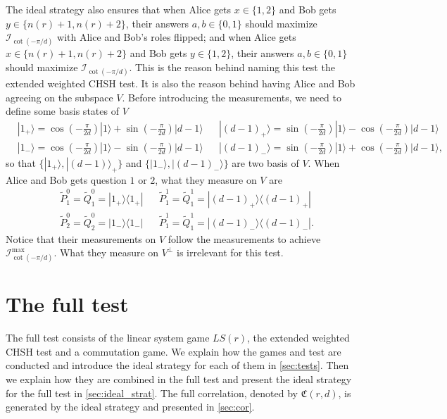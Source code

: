 \documentclass[11pt,letterpaper]{article}
\newcommand{\ket}[1]{|#1\rangle}
\newcommand{\ketbra}[2]{|#1\rangle\langle#2|}
\newcommand{\1}{\mathbb{1}}
\newcommand{\LS}{LS}
\newcommand{\tP}{\tilde{P}}
\newcommand{\tQ}{\tilde{Q}}
\newcommand{\nr}{n(r)}
\newcommand{\fC}{\mathfrak{C}}
\newcommand{\I}{\mathcal{I}}
\theoremstyle{definition}
\begin{document}
The ideal strategy also ensures that 
when Alice gets $x \in \{1,2\}$ and Bob gets $y \in \{\nr+1, \nr+2\}$, 
their answers $a,b \in \{0,1\}$ should maximize $\I_{\cot(-\pi/d)}$ with Alice and Bob's roles flipped;
and when Alice gets $x \in \{\nr+1,\nr+2\}$ and Bob gets $y \in \{1, 2\}$,
their answers $a,b \in \{0,1\}$ should maximize $\I_{\cot(-\pi/d)}$.
This is the reason behind naming this test the extended weighted CHSH test.
It is also the reason behind having Alice and Bob agreeing on the subspace $V$.
Before introducing the measurements, 
we need to define some basis states of $V$
\begin{align*}
	&\ket{1_+} = \cos(-\frac{\pi}{2d})\ket{1} + \sin(-\frac{\pi}{2d})\ket{d-1}
	&&\ket{(d-1)_+} = \sin(-\frac{\pi}{2d})\ket{1} - \cos(-\frac{\pi}{2d})\ket{d-1}\\
	&\ket{1_-} = \cos(-\frac{\pi}{2d})\ket{1} - \sin(-\frac{\pi}{2d})\ket{d-1}
	&&\ket{(d-1)_-} = \sin(-\frac{\pi}{2d})\ket{1} + \cos(-\frac{\pi}{2d})\ket{d-1},
\end{align*}
so that $\{\ket{1_+}, \ket{(d-1)}_+\}$ and $\{\ket{1_-}, \ket{(d-1)_-}\}$ are two basis
of $V$.
When Alice and Bob gets question $1$ or $2$, what they measure on $V$ are
\begin{align*}
	&\tP_1^0 = \tQ_1^0 =  \ketbra{1_+}{1_+} && \tP_1^1 = \tQ_1^1 =  \ketbra{(d-1)_+}{(d-1)_+}\\
	&\tP_2^0 = \tQ_2^0 =  \ketbra{1_-}{1_-} && \tP_1^1 = \tQ_1^1 =  \ketbra{(d-1)_-}{(d-1)_-}.
\end{align*}
Notice that their measurements on $V$ follow the measurements to achieve $\I_{\cot(-\pi/d)}^{\max}$.
What they measure on $V^\perp$ is irrelevant for this test. 



\section{The full test}
\label{sec:full_test}
The full test consists of the linear system game $\LS(r)$,
the extended weighted CHSH test and a commutation game. We explain how the games and test are conducted and
introduce the ideal strategy for each of them in \cref{sec:tests}. 
Then we explain how they are combined in the full test and present the ideal strategy for the full test in \cref{sec:ideal_strat}. The full correlation, denoted by $\fC(r,d)$, is generated by the ideal strategy and presented in \cref{sec:cor}.
\end{document}
